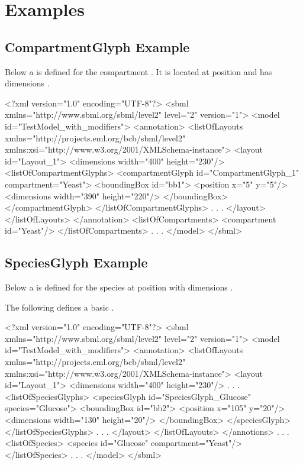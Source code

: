 
\section{Examples}
\label{examples}
\subsection{CompartmentGlyph Example}
Below a \CompartmentGlyph is defined for the compartment . 
It is located at position and has dimensions 
. 


\label{example:compartmentglyph}
\begin{example}
<?xml version="1.0" encoding="UTF-8"?>
<sbml xmlns="http://www.sbml.org/sbml/level2" level="2" version="1">
  <model id="TestModel_with_modifiers">
    <annotation>
     <listOfLayouts xmlns="http://projects.eml.org/bcb/sbml/level2"
              xmlns:xsi="http://www.w3.org/2001/XMLSchema-instance">
      <layout id="Layout_1">
        <dimensions width="400" height="230"/>
        <listOfCompartmentGlyphs>
          <compartmentGlyph id="CompartmentGlyph_1" compartment="Yeast">
            <boundingBox id="bb1">
              <position x="5" y="5"/>
              <dimensions width="390" height="220"/>
            </boundingBox>
          </compartmentGlyph>
        </listOfCompartmentGlyphs>
                .
                .
                .
      </layout>
     </listOfLayouts>
    </annotation>
    <listOfCompartments>
      <compartment id="Yeast"/>
    </listOfCompartments>
        .
        .
        .
  </model> 
</sbml>
\end{example}

\subsection{SpeciesGlyph Example}
Below a \SpeciesGlyph is defined for the species  at 
position  with dimensions . 


The following defines a basic \SpeciesGlyph. 
\label{example:speciesglyph}
\begin{example}
<?xml version="1.0" encoding="UTF-8"?>
<sbml xmlns="http://www.sbml.org/sbml/level2" level="2" version="1">
  <model id="TestModel_with_modifiers">
    <annotation>
     <listOfLayouts xmlns="http://projects.eml.org/bcb/sbml/level2"
              xmlns:xsi="http://www.w3.org/2001/XMLSchema-instance">
      <layout id="Layout_1">
        <dimensions width="400" height="230"/>
                .
                .
                .
        <listOfSpeciesGlyphs>
          <speciesGlyph id="SpeciesGlyph_Glucose" species="Glucose">
            <boundingBox id="bb2">
              <position x="105" y="20"/>
              <dimensions width="130" height="20"/>
            </boundingBox>
          </speciesGlyph>
        </listOfSpeciesGlyphs>  
            .
            .
            . 
       </layout>
      </listOfLayouts>
    </annotions>
         .
         .
         .
    <listOfSpecies>
      <species id="Glucose" compartment="Yeast"/>
    </listOfSpecies>
       .
       .
       .  
  </model>
</sbml>
\end{example}


